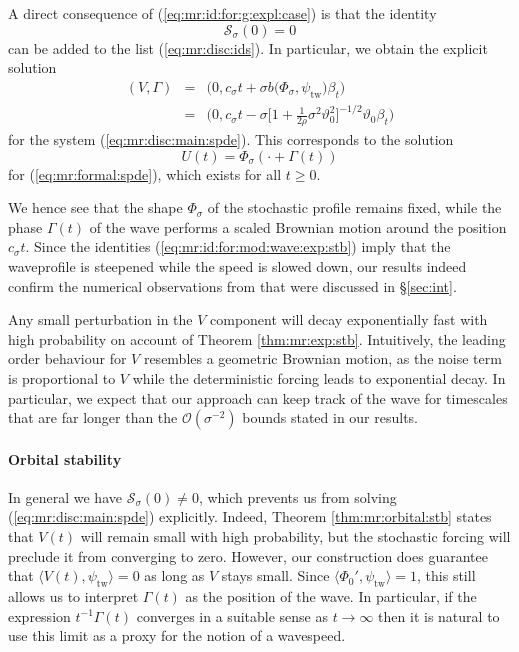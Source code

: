 \documentclass[10pt]{articleHJ}
\newcommand{\G}{\ensuremath{\Gamma}}
\renewcommand{\O}{\ensuremath{\mathcal{O}}}
\newcommand{\sref}[1]{(\ref{#1})}                       %
\numberwithin{equation}{section}
\begin{document}
A direct consequence of \sref{eq:mr:id:for:g:expl:case}
is that the identity
\begin{equation}
\mathcal{S}_{\sigma}(0) = 0
\end{equation}
can be added to the list \sref{eq:mr:disc:ids}.
In particular,
we obtain the explicit solution
\begin{equation}
\begin{array}{lcl}
(V, \Gamma) & = &
\Big( 0 , c_{\sigma} t + \sigma b(\Phi_{\sigma} , \psi_{\mathrm{tw}} \big) \beta_t \Big)
\\[0.2cm]
& = &
\Big( 0 , c_{\sigma} t - \sigma \big[ 1 + \frac{1}{2 \rho} \sigma^2 \vartheta_0^2]^{-1/2} \vartheta_0 \beta_t \Big)
\end{array}
\end{equation}
for the system \sref{eq:mr:disc:main:spde}.
This corresponds to the solution
\begin{equation}
U(t) = \Phi_{\sigma}(\cdot + \Gamma(t))
\end{equation}
for \sref{eq:mr:formal:spde}, which exists
for all $t \ge 0$.

We hence see that the shape $\Phi_{\sigma}$
of the stochastic profile remains fixed,
while the phase $\Gamma(t)$ of the wave performs
a scaled Brownian motion around the position $c_{\sigma} t$.
Since the identities \sref{eq:mr:id:for:mod:wave:exp:stb}
imply that the waveprofile is steepened
while the speed is slowed down,
our results indeed confirm the numerical observations
from \cite{Lord2012} that were discussed in \S\ref{sec:int}.

Any small perturbation in the $V$ component will decay exponentially fast with
high probability
on account of Theorem \ref{thm:mr:exp:stb}. Intuitively,
the leading order behaviour for $V$ resembles a geometric Brownian motion,
as the noise term is proportional to $V$ while the deterministic forcing
leads to exponential decay. In particular, we expect
that our approach can keep track of the wave for timescales that
are far longer than the $\O(\sigma^{-2})$ bounds stated in our results.



\paragraph{Orbital stability}
In general we have $\mathcal{S}_{\sigma}(0) \neq 0$,
which prevents us from
solving \sref{eq:mr:disc:main:spde} explicitly.
Indeed, Theorem \ref{thm:mr:orbital:stb} states that
$V(t)$ will remain small with high probability,
but the stochastic forcing will preclude it from
converging to zero. However, our construction does guarantee
that $\langle V(t), \psi_{\mathrm{tw}} \rangle = 0$
as long as $V$ stays small. Since $\langle \Phi_0' , \psi_{\mathrm{tw}} \rangle = 1$,
this still allows us to interpret
$\G(t)$ as the position of the wave.
In particular, if the expression
$t^{-1} \Gamma(t)$ converges in a suitable sense as $t \to \infty$
then it is natural to use this limit as a proxy for the notion of a wavespeed.
\end{document}
